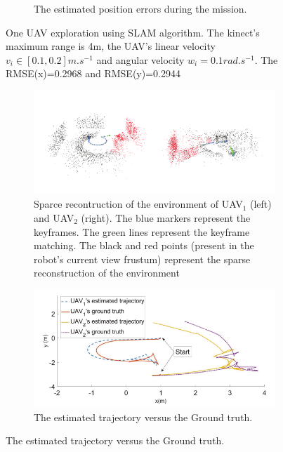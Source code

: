 \begin{figure}[H]
\begin{subfigure}[t]{0.8\linewidth}
        \caption{{The estimated position errors during the mission.}}
        \label{fig:2.22c}
    \end{subfigure}
    \caption{One UAV exploration using SLAM algorithm. The kinect's maximum range is 4m, the UAV's linear velocity $v_i \in [0.1, 0.2]m.s^{-1}$ and angular velocity $w_i=0.1 rad.s^{-1}$. The RMSE(x)=0.2968 and RMSE(y)=0.2944}
    \label{fig:2.22}
\end{figure}
\begin{figure}[H]
    \centering
    \begin{subfigure}[t]{0.8\linewidth}
        \centering
        \includegraphics[width=\linewidth]{assets/2_23_a.png}
        \caption{{Sparce recontruction of the environment of UAV$_1$ (left) and UAV$_2$ (right). The blue markers represent the keyframes. The green lines represent the keyframe matching. The black and red points (present in the robot's current view frustum) represent the sparse reconstruction of the environment}}
        \label{fig:2.23a}
    \end{subfigure}
    \begin{subfigure}[t]{0.8\linewidth}
        \centering
        \includegraphics[width=\linewidth]{assets/2_23_b.png}
        \caption{{The estimated trajectory versus the Ground truth.}}
        \label{fig:2.23b}
    \end{subfigure}

\end{figure}
